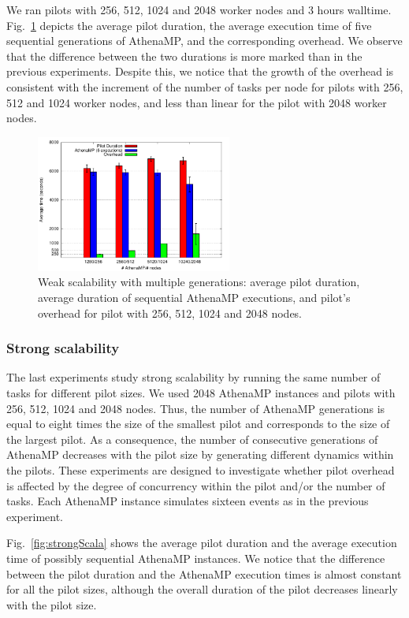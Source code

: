 We ran pilots with 256, 512, 1024 and 2048 worker nodes and 3 hours
walltime. Fig.~\ref{fig:weakScal2a} depicts the average pilot duration, the
average execution time of five sequential generations of AthenaMP, and the
corresponding overhead. We observe that the difference between the two durations
is more marked than in the previous experiments. Despite this, we notice that
the growth of the overhead is consistent with the increment of the number of
tasks per node for pilots with 256, 512 and 1024 worker nodes, and less than
linear for the pilot with 2048 worker nodes.

\begin{figure}[!htb]
        \includegraphics[height=4.5cm,width=\columnwidth]{./figures/NGE/weak2.pdf}
    \caption{Weak scalability with multiple generations: average pilot
    duration, average duration of sequential AthenaMP executions, and
    pilot's overhead for pilot with 256, 512, 1024 and 2048 nodes.}
\label{fig:weakScal2a}
\end{figure}

\subsubsection{Strong scalability}

The last experiments  study strong scalability by running the same number of
tasks for different pilot sizes. We used 2048 AthenaMP instances and  pilots
with 256, 512, 1024 and 2048 nodes. Thus, the number of AthenaMP generations is
equal to eight times the size of the smallest pilot and corresponds to the size
of the largest pilot. As a consequence, the number of consecutive generations of
AthenaMP decreases with the pilot size by generating different dynamics within
the pilots. These experiments are designed to investigate whether pilot overhead
is affected by the degree of concurrency within the pilot and/or the number of
tasks. Each AthenaMP instance simulates sixteen events as in the previous
experiment.

Fig.~\ref{fig:strongScala}  shows the average pilot duration and the average
execution time of possibly sequential AthenaMP instances.  We  notice that the
difference between the pilot duration and the AthenaMP execution times is almost
constant for all the pilot sizes, although the overall duration of the pilot
decreases linearly with the pilot size.

